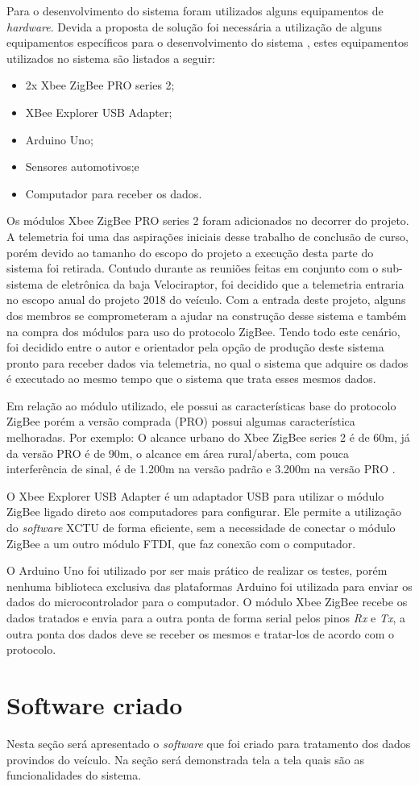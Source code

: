 Para o desenvolvimento do sistema foram utilizados alguns equipamentos de \textit{hardware}. Devida a proposta de solução foi necessária a utilização de alguns equipamentos específicos para o desenvolvimento do sistema , estes equipamentos utilizados no sistema são listados a seguir:

\begin{itemize}
	\item 2x Xbee ZigBee PRO series 2;
	\item XBee Explorer USB Adapter;
	\item Arduino Uno;
	\item Sensores automotivos;e
	\item Computador para receber os dados. 
\end{itemize}  

Os módulos Xbee ZigBee PRO series 2 foram adicionados no decorrer do projeto. A telemetria foi uma das aspirações iniciais desse trabalho de conclusão de curso, porém devido ao tamanho do escopo do projeto a execução desta parte do sistema foi retirada. Contudo durante as reuniões feitas em conjunto com o sub-sistema de eletrônica da baja Velociraptor, foi decidido que a telemetria entraria no escopo anual do projeto 2018 do veículo. Com a entrada deste projeto, alguns dos membros se comprometeram a ajudar na construção desse sistema e também na compra dos módulos para uso do protocolo ZigBee. Tendo todo este cenário, foi decidido entre o autor e orientador pela opção de produção deste sistema pronto para receber dados via telemetria, no qual o sistema que adquire os dados é executado ao mesmo tempo que o sistema que trata esses mesmos dados. 

Em relação ao módulo utilizado, ele possui as características base do protocolo ZigBee porém a versão comprada (PRO) possui algumas característica melhoradas. Por exemplo: O alcance urbano do Xbee ZigBee series 2 é de 60m, já da versão PRO é de 90m, o alcance em área rural/aberta, com pouca interferência de sinal, é de 1.200m na versão padrão e 3.200m na versão PRO \cite{xbeespecs}.

O Xbee Explorer USB Adapter é um adaptador USB para utilizar o módulo ZigBee ligado direto aos computadores para configurar. Ele permite a utilização do \textit{software} XCTU de forma eficiente, sem a necessidade de conectar o módulo ZigBee a um outro módulo FTDI, que faz conexão com o computador. 

O Arduino Uno foi utilizado por ser mais prático de realizar os testes, porém nenhuma biblioteca exclusiva das plataformas Arduino foi utilizada para enviar os dados do microcontrolador para o computador. O módulo Xbee ZigBee recebe os dados tratados e envia para a outra ponta de forma serial pelos pinos \textit{Rx} e \textit{Tx}, a outra ponta dos dados deve se receber os mesmos e tratar-los de acordo com o protocolo.

\section {Software criado}
Nesta seção será apresentado o \textit{software} que foi criado para tratamento dos dados provindos do veículo. Na seção será demonstrada tela a tela quais são as funcionalidades do sistema.  

